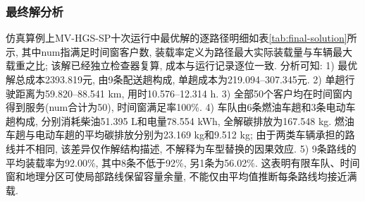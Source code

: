 \documentclass{setp-new}
\begin{document}
\subsubsection{最终解分析}

仿真算例上MV-HGS-SP十次运行中最优解的逐路径明细如表\ref{tab:final-solution}所示,
其中num指满足时间窗客户数, 装载率定义为路径最大实际装载量与车辆最大载重之比;
该解已经独立检查器复算, 成本与运行记录逐位一致.
分析可知:
1) 最优解总成本2393.819元, 由9条配送趟构成, 单趟成本为219.094--307.345元.
2) 单趟行驶距离为59.820--88.541 km, 用时10.576--12.314 h.
3) 全部50个客户均在时间窗内得到服务(num合计为50), 时间窗满足率100\%.
4) 车队由6条燃油车趟和3条电动车趟构成, 分别消耗柴油51.395 L和电量78.554 kWh,
全解碳排放为167.548 kg. 燃油车趟与电动车趟的平均碳排放分别为23.169 kg和9.512 kg;
由于两类车辆承担的路线并不相同, 该差异仅作解结构描述, 不解释为车型替换的因果效应.
5) 9条路线的平均装载率为92.00\%, 其中8条不低于92\%, 另1条为56.02\%.
这表明有限车队、时间窗和地理分区可使局部路线保留容量余量, 不能仅由平均值推断每条路线均接近满载.
\end{document}
